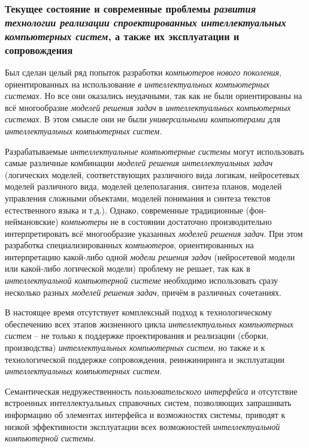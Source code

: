 \subsubsection{Текущее состояние и современные проблемы \textbf{\textit{развития}} \textbf{\textit{технологии реализации спроектированных интеллектуальных компьютерных систем}}, а также их эксплуатации и сопровождения}

Был сделан целый ряд попыток разработки \textit{компьютеров} \textit{нового поколения}, ориентированных на использование \textit{в интеллектуальных компьютерных системах.} Но все они оказались неудачными, так как не были ориентированы на всё многообразие \textit{моделей решения задач} в \textit{интеллектуальных компьютерных системах}. В этом смысле они не были \textit{универсальными компьютерами} для \textit{интеллектуальных компьютерных систем.}

Разрабатываемые \textit{интеллектуальные компьютерные системы} могут использовать самые различные комбинации \textit{моделей решения интеллектуальных задач} (логических моделей, соответствующих различного вида логикам, нейросетевых моделей различного вида, моделей целеполагания, синтеза планов, моделей управления сложными объектами, моделей понимания и синтеза текстов естественного языка и т.д.). Однако, современные традиционные (фон-неймановские) \textit{компьютеры} не в состоянии достаточно производительно интерпретировать всё многообразие указанных \textit{моделей решения задач}. При этом разработка специализированных \textit{компьютеров}, ориентированных на интерпретацию какой-либо одной \textit{модели решения задач} (нейросетевой модели или какой-либо логической модели) проблему не решает, так как в \textit{интеллектуальной компьютерной системе} необходимо использовать сразу несколько разных \textit{моделей решения задач}, причём в различных сочетаниях.

В настоящее время отсутствует комплексный подход к технологическому обеспечению всех этапов жизненного цикла \textit{интеллектуальных компьютерных систем} -- не только к поддержке проектирования и реализации (сборки, производства) \textit{интеллектуальных компьютерных систем}, но также и к технологической поддержке сопровождения, реинжиниринга и эксплуатации \textit{интеллектуальных компьютерных систем}.

Семантическая недружественность \textit{пользовательского интерфейса} и отсутствие встроенных интеллектуальных справочных систем, позволяющих запрашивать информацию об элементах интерфейса и возможностях системы, приводят к низкой эффективности эксплуатации всех возможностей \textit{интеллектуальной компьютерной системы}.

